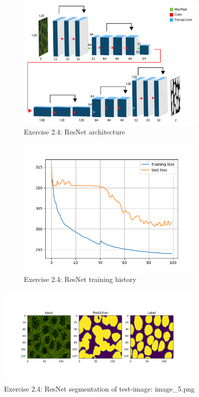 \documentclass[a4paper,10pt]{article}
\begin{document}
 \begin{figure}[htbp]
 \begin{subfigure}{0.5\textwidth}
    \includegraphics[width=\textwidth]{figures/assignment_3/resnet.pdf}
    \caption{Exercise 2.4: ResNet architecture}
    \label{fig:resnet}{}
  \end{subfigure}
  \hfill
  \begin{subfigure}{0.5\textwidth}
    \includegraphics[width=\textwidth]{figures/assignment_3/resnet_history.png}
    \caption{Exercise 2.4: ResNet training history}
    \label{fig:resnethist}
  \end{subfigure}
  \label{fig:both_images}
  \caption{}
\end{figure}

\begin{figure}[ht!]
\centering
\includegraphics[width=100mm]{figures/assignment_3/restnet_im5.png}
\caption{Exercise 2.4: ResNet segmentation of test-image: image\_5.png}
\label{fig:resnet5}
\end{figure}
\end{document}
